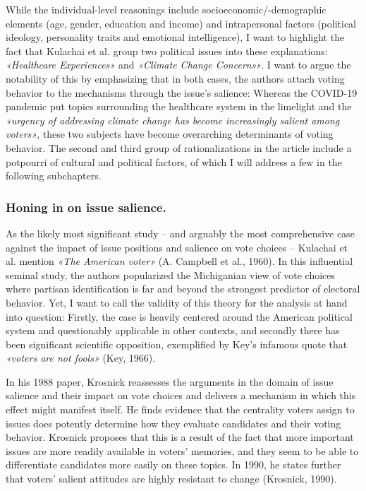 \documentclass[11pt,a4paper]{article}
\begin{document}
While the individual-level reasonings include socioeconomic/-demographic elements (age, gender, education and income) and intrapersonal factors (political ideology, personality traits and emotional intelligence), I want to highlight the fact that Kulachai et al. group two political issues into these explanations: \textit{«Healthcare Experiences»} and \textit{«Climate Change Concerns»}. I want to argue the notability of this by emphasizing that in both cases, the authors attach voting behavior to the mechanisms through the issue’s salience: Whereas the COVID-19 pandemic put topics surrounding the healthcare system in the limelight and the \textit{«urgency of addressing climate change has become increasingly salient among voters»}, these two subjects have become overarching determinants of voting behavior. The second and third group of rationalizations in the article include a potpourri of cultural and political factors, of which I will address a few in the following subchapters.

\subsubsection{Honing in on issue salience.}
As the likely most significant study – and arguably the most comprehensive case against the impact of issue positions and salience on vote choices – Kulachai et al. mention \textit{«The American voter» }(A. Campbell et al., 1960). In this influential seminal study, the authors popularized the Michiganian view of vote choices where partisan identification is far and beyond the strongest predictor of electoral behavior. Yet, I want to call the validity of this theory for the analysis at hand into question: Firstly, the case is heavily centered around the American political system and questionably applicable in other contexts, and secondly there has been significant scientific opposition, exemplified by Key’s infamous quote that \textit{«voters are not fools»} (Key, 1966).

In his 1988 paper, Krosnick reassesses the arguments in the domain of issue salience and their impact on vote choices and delivers a mechanism in which this effect might manifest itself. He finds evidence that the centrality voters assign to issues does potently determine how they evaluate candidates and their voting behavior. Krosnick proposes that this is a result of the fact that more important issues are more readily available in voters’ memories, and they seem to be able to differentiate candidates more easily on these topics. In 1990, he states further that voters’ salient attitudes are highly resistant to change (Krosnick, 1990).
\end{document}
